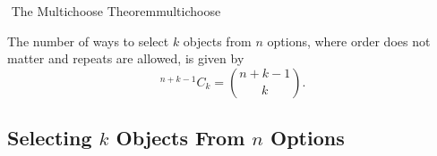         \begin{theorem}{\Stop\,\,The Multichoose Theorem}{multichoose}
        
            The number of ways to select \(k\) objects from \(n\) options, where order does not matter and repeats are allowed, is given by
            \begin{equation*}
                ^{n+k-1}C_k=\binom{n+k-1}{k}.
            \end{equation*}
            
        \end{theorem}
        
    \pagebreak
        
    \subsection{Selecting \(k\) Objects From \(n\) Options}
    

